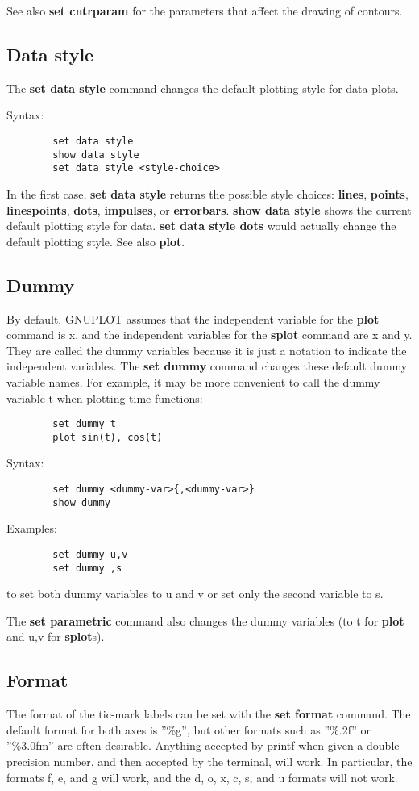 See also {\bf set cntrparam} for the parameters that affect the drawing of 
contours.
\subsection{Data style}
The {\bf set data style} command changes the default plotting style
for data plots.

Syntax:
\begin{verbatim}
        set data style 
        show data style 
        set data style <style-choice>
\end{verbatim}

In the first case, {\bf set data style} returns the possible style
choices:  {\bf lines}, {\bf points}, {\bf linespoints}, {\bf dots}, {\bf impulses}, 
or {\bf errorbars}.  {\bf show data style} shows the current default
plotting style for data.  {\bf set data style dots} would actually 
change the default plotting style.  See also {\bf plot}.
\subsection{Dummy}
By default, GNUPLOT assumes that the independent variable for the
{\bf plot} command is x, and the independent variables for the {\bf splot}
command are x and y. They are called the dummy variables because it
is just a notation to indicate the independent variables. The {\bf set
dummy} command changes these default dummy variable names. For
example, it may be more convenient to call the dummy variable t
when plotting time functions:

\begin{verbatim}
        set dummy t
        plot sin(t), cos(t)
\end{verbatim}

Syntax:
\begin{verbatim}
        set dummy <dummy-var>{,<dummy-var>}
        show dummy
\end{verbatim}

Examples:
\begin{verbatim}
        set dummy u,v
        set dummy ,s
\end{verbatim}

to set both dummy variables to u and v or set only the second
variable to s.

The {\bf set parametric} command also changes the dummy variables (to t
for {\bf plot} and u,v for {\bf splot}s).

\subsection{Format}
The format of the tic-mark labels can be set with the {\bf set format}
command. The default format for both axes is ''\%g'', but other formats
such as ''\%.2f'' or ''\%3.0fm'' are often desirable. Anything accepted by
printf when given a double precision number, and then accepted by the
terminal, will work. In particular, the formats f, e, and g will work,
and the d, o, x, c, s, and u formats will not work.

